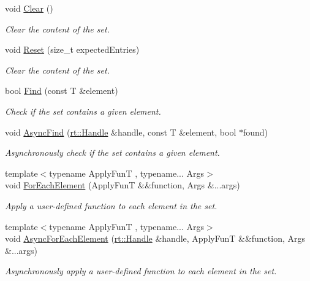\begin{DoxyCompactItemize}
void \hyperlink{classshad_1_1LocalSet_a353e2e7213ef80115b9d83384805ef86}{Clear} ()
\begin{DoxyCompactList}\small\item\em Clear the content of the set. \end{DoxyCompactList}\item 
void \hyperlink{classshad_1_1LocalSet_ae567f65f5cfef1f10b2564dbd5359397}{Reset} (size\-\_\-t expected\-Entries)
\begin{DoxyCompactList}\small\item\em Clear the content of the set. \end{DoxyCompactList}\item 
bool \hyperlink{classshad_1_1LocalSet_a85b7acc8667bdac371d75c8f89cbb17a}{Find} (const T \&element)
\begin{DoxyCompactList}\small\item\em Check if the set contains a given element. \end{DoxyCompactList}\item 
void \hyperlink{classshad_1_1LocalSet_a02a733b9dfac60163cf9ad479adb7781}{Async\-Find} (\hyperlink{classshad_1_1rt_1_1Handle}{rt\-::\-Handle} \&handle, const T \&element, bool $\ast$found)
\begin{DoxyCompactList}\small\item\em Asynchronously check if the set contains a given element. \end{DoxyCompactList}\item 
{\footnotesize template$<$typename Apply\-Fun\-T , typename... Args$>$ }\\void \hyperlink{classshad_1_1LocalSet_aca564263c955f5cea5c5e931ddd81be6}{For\-Each\-Element} (Apply\-Fun\-T \&\&function, Args \&...args)
\begin{DoxyCompactList}\small\item\em Apply a user-\/defined function to each element in the set. \end{DoxyCompactList}\item 
{\footnotesize template$<$typename Apply\-Fun\-T , typename... Args$>$ }\\void \hyperlink{classshad_1_1LocalSet_a51f64eb4b2b320ddb9972cec686e49e2}{Async\-For\-Each\-Element} (\hyperlink{classshad_1_1rt_1_1Handle}{rt\-::\-Handle} \&handle, Apply\-Fun\-T \&\&function, Args \&...args)
\begin{DoxyCompactList}\small\item\em Asynchronously apply a user-\/defined function to each element in the set. \end{DoxyCompactList}\item 

\end{DoxyCompactItemize}
